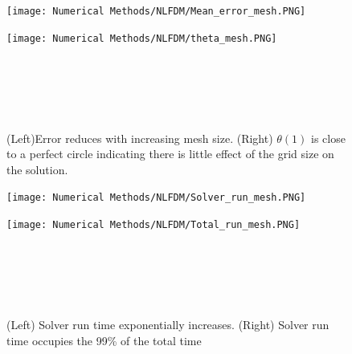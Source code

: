 \documentclass[12pt]{article}
\begin{document}
\begin{figure}[H]
\begin{minipage}{.5\textwidth}
    \hspace{-0.4cm}
    \vspace{-1.4cm}
  \texttt{[image: Numerical Methods/NLFDM/Mean\_error\_mesh.PNG]}
  \label{fig:18}
\end{minipage}%
\begin{minipage}{.5\textwidth}
  \hspace{0.7cm}
  \vspace{-1.4cm}
  \texttt{[image: Numerical Methods/NLFDM/theta\_mesh.PNG]}
  \label{fig:19}
\end{minipage}
\\ \\ \\ \\
\caption{(Left)Error reduces with increasing mesh size. (Right) $\theta(1)$ is close to a perfect circle indicating there is little effect of the grid size on the solution. }
\end{figure}

\begin{figure}[H]
\begin{minipage}{.5\textwidth}
    \hspace{-0.4cm}
    \vspace{-1.4cm}
  \texttt{[image: Numerical Methods/NLFDM/Solver\_run\_mesh.PNG]}
  \label{fig:20}
\end{minipage}%
\begin{minipage}{.5\textwidth}
  \hspace{0.7cm}
  \vspace{-1.4cm}
  \texttt{[image: Numerical Methods/NLFDM/Total\_run\_mesh.PNG]}
  \label{fig:21}
\end{minipage}
\\ \\ \\ \\
\caption{(Left) Solver run time exponentially increases. (Right) Solver run time occupies the 99\% of the total time}
\end{figure}
\end{document}
